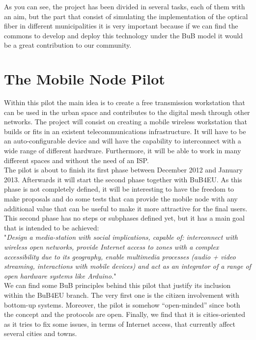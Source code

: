 \documentclass[draftclsnofoot,12pt,journal,onecolumn]{IEEEtran}
\begin{document}
As you can see, the project has been divided in several tasks, each of them with an aim, but the part that consist of simulating the implementation of the optical fiber in different municipalities it is very important because if we can find the commons to develop and deploy this technology under the BuB model it would be a great contribution to our community.

\section{The Mobile Node Pilot}
\label{sec:mon}

Within this pilot the main idea is to create a free transmission workstation that can be used in the urban space and contributes to the digital mesh through other networks. The project will consist on creating a mobile wireless workstation that builds or fits in an existent telecommunications infrastructure. It will have to be an auto-configurable device and will have the capability to interconnect with a wide range of different hardware. Furthermore, it will be able to work in many different spaces and without the need of an ISP.
\\

The pilot is about to finish its first phase between December 2012 and January 2013. Afterwards it will start the second phase together with BuB4EU. As this phase is not completely defined, it will be interesting to have the freedom to make proposals and do some tests that can provide the mobile node with any additional value that can be useful to make it more attractive for the final users. This second phase has no steps or subphases defined yet, but it has a main goal that is intended to be achieved:
\\

"\textit{Design a media-station with social implications, capable of: interconnect with wireless open networks, provide Internet access to zones with a complex accessibility due to its geography, enable multimedia processes (audio + video streaming, interactions with mobile devices) and act as an integrator of a range of open hardware systems like Arduino.}"
\\

We can find some BuB principles behind this pilot that justify its inclusion within the BuB4EU branch. The very first one is the citizen involvement with bottom-up systems. Moreover, the pilot is somehow "`open-minded"' since both the concept and the protocols are open. Finally, we find that it is cities-oriented as it tries to fix some issues, in terms of Internet access, that currently affect several cities and towns. 
\\
\end{document}
